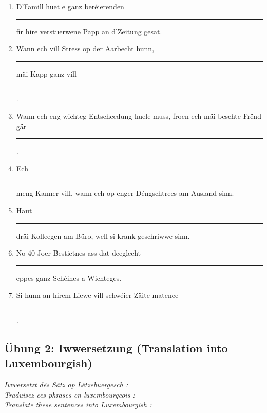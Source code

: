 \begin{enumerate}
    \item D'Famill huet e ganz beréierenden \rule{3.5cm}{0.4pt} fir hire verstuerwene Papp an d'Zeitung gesat.
    
    \item Wann ech vill Stress op der Aarbecht hunn, \rule{3.5cm}{0.4pt} mäi Kapp ganz vill \rule{2cm}{0.4pt}.
    
    \item Wann ech eng wichteg Entscheedung huele muss, froen ech mäi beschte Frënd gär \rule{3.5cm}{0.4pt}.
    
    \item Ech \rule{3.5cm}{0.4pt} meng Kanner vill, wann ech op enger Déngschtrees am Ausland sinn.
    
    \item Haut \rule{3.5cm}{0.4pt} dräi Kolleegen am Büro, well si krank geschriwwe sinn.
    
    \item No 40 Joer Bestietnes ass dat deeglecht \rule{3.5cm}{0.4pt} eppes ganz Schéines a Wichteges.
    
    \item Si hunn an hirem Liewe vill schwéier Zäite matenee \rule{3.5cm}{0.4pt}.
\end{enumerate}

\vspace{1.5em}

\subsection*{Übung 2: Iwwersetzung (Translation into Luxembourgish)}
\textit{Iwwersetzt dës Sätz op Lëtzebuergesch :}\\
\textit{Traduisez ces phrases en luxembourgeois :}\\
\textit{Translate these sentences into Luxembourgish :}

